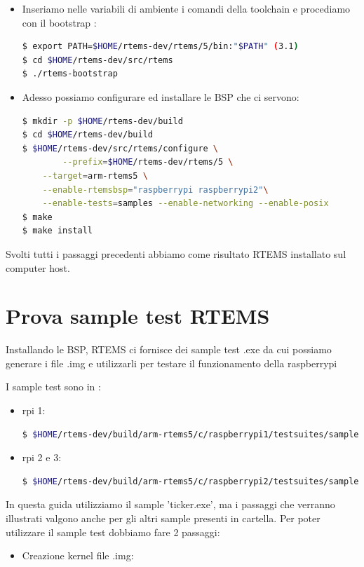 \documentclass[10pt, a4paper]{article}
\begin{document}
\begin{flushleft}
\begin{itemize}
\item Inseriamo nelle variabili di ambiente i comandi della toolchain e procediamo con il bootstrap : 
\begin{lstlisting}[language=bash] 
$ export PATH=$HOME/rtems-dev/rtems/5/bin:"$PATH" (3.1)
$ cd $HOME/rtems-dev/src/rtems
$ ./rtems-bootstrap
\end{lstlisting}	
	
\item Adesso possiamo configurare ed installare le BSP che ci servono: 
\begin{lstlisting}[language=bash] 
$ mkdir -p $HOME/rtems-dev/build
$ cd $HOME/rtems-dev/build
$ $HOME/rtems-dev/src/rtems/configure \
        --prefix=$HOME/rtems-dev/rtems/5 \
	--target=arm-rtems5 \
	--enable-rtemsbsp="raspberrypi raspberrypi2"\
	--enable-tests=samples --enable-networking --enable-posix
$ make
$ make install	
\end{lstlisting}
		
\end{itemize}

Svolti tutti i passaggi precedenti abbiamo come risultato RTEMS installato sul computer host.
\newpage
\section{Prova sample test RTEMS}

Installando le BSP, RTEMS ci fornisce dei sample test .exe da cui possiamo generare i file .img e utilizzarli per testare il funzionamento della raspberrypi

I sample test sono in : 
\begin{itemize}
\item  rpi 1:
\begin{lstlisting}[language=bash] 
$ $HOME/rtems-dev/build/arm-rtems5/c/raspberrypi1/testsuites/samples
\end{lstlisting}
\item  rpi 2 e 3:
\begin{lstlisting}[language=bash] 
$ $HOME/rtems-dev/build/arm-rtems5/c/raspberrypi2/testsuites/samples
\end{lstlisting}
\end{itemize}

In questa guida utilizziamo il sample 'ticker.exe', ma i passaggi che verranno illustrati valgono anche per gli altri sample presenti in cartella.
Per poter utilizzare il sample test dobbiamo fare 2 passaggi:
\begin{itemize}
\item Creazione kernel file .img:


\end{itemize}
\end{flushleft}
\end{document}
